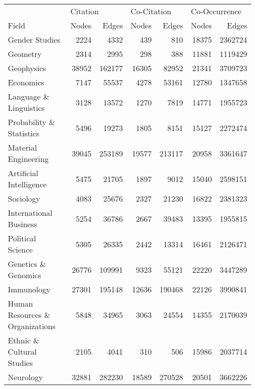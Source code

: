 \begin{tabular}{lrrrrrr}
\toprule
                                & \multicolumn{2}{l}{Citation} & \multicolumn{2}{l}{Co-Citation} & \multicolumn{2}{l}{Co-Occurrence} \\
                          Field &    Nodes &  Edges &       Nodes &  Edges &         Nodes &   Edges \\
\midrule
                 Gender Studies &     2224 &   4332 &         439 &    810 &         18375 & 2362724 \\
                       Geometry &     2314 &   2995 &         298 &    388 &         11881 & 1119429 \\
                     Geophysics &    38952 & 162177 &       16305 &  82952 &         21341 & 3709723 \\
                      Economics &     7147 &  55537 &        4278 &  53161 &         12780 & 1347658 \\
         Language \& Linguistics &     3128 &  13572 &        1270 &   7819 &         14771 & 1955723 \\
       Probability \& Statistics &     5496 &  19273 &        1805 &   8151 &         15127 & 2272474 \\
           Material Engineering &    39045 & 253189 &       19577 & 213117 &         20958 & 3361647 \\
        Artificial Intelligence &     5475 &  21705 &        1897 &   9012 &         15040 & 2598151 \\
                      Sociology &     4083 &  25676 &        2327 &  21230 &         16822 & 2381323 \\
         International Business &     5254 &  36786 &        2667 &  39483 &         13395 & 1955815 \\
              Political Science &     5305 &  26335 &        2442 &  13314 &         16461 & 2126471 \\
            Genetics \& Genomics &    26776 & 109991 &        9323 &  55121 &         22220 & 3447289 \\
                     Immunology &    27301 & 195148 &       12636 & 190468 &         22126 & 3990841 \\
Human Resources \& Organizations &     5848 &  34965 &        3063 &  24554 &         14355 & 2170039 \\
      Ethnic \& Cultural Studies &     2105 &   4041 &         310 &    506 &         15986 & 2037714 \\
                      Neurology &    32881 & 282230 &       18589 & 270528 &         20501 & 3662226 \\
\bottomrule
\end{tabular}

